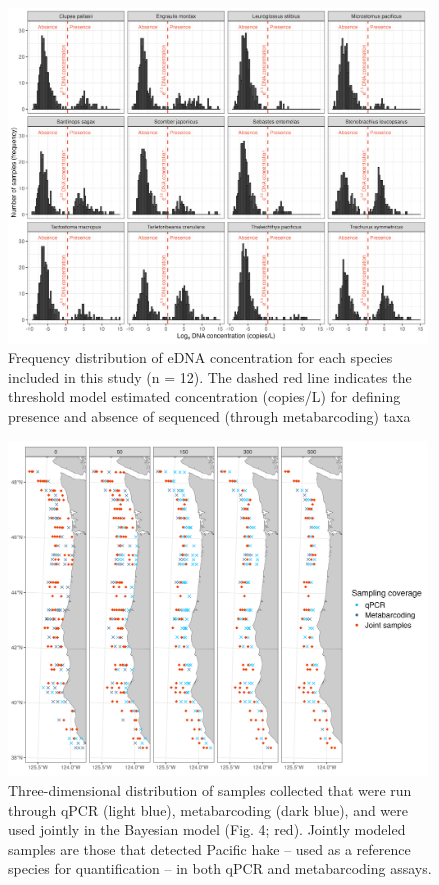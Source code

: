 \documentclass{article}
\begin{document}
\begin{figure}
\centering
\includegraphics[width=0.99\textwidth]{plots/6_Supplementary_Figure_2.jpg}
\caption{Frequency distribution of eDNA concentration for each species included in this study (n = 12). The dashed red line indicates the threshold model estimated concentration (copies/L) for defining presence and absence of sequenced (through metabarcoding) taxa}
\label{fig:presence_threshold}
\end{figure}

\begin{figure}
\centering
\includegraphics[width=0.99\textwidth]{plots/7_Supplementary_Figure_3.jpg}
\caption{Three-dimensional distribution of samples collected that were run through qPCR (light blue), metabarcoding (dark blue), and were used jointly in the Bayesian model (Fig. 4; red). Jointly modeled samples are those that detected Pacific hake -- used as a reference species for quantification -- in both qPCR and metabarcoding assays.}
\end{figure}
\end{document}
